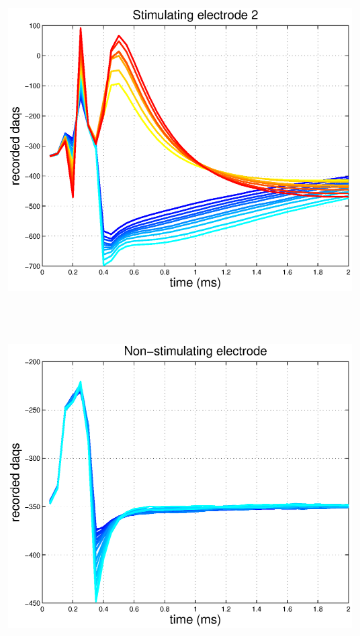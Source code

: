 \documentclass[12pt,letterpaper,fleqn]{article}
\begin{document}
\begin{figure}[ht!]
       ~ \begin{subfigure}[b]{0.32\textwidth}
                \includegraphics[width=\textwidth]{ArtMeanS2.eps}
                \caption{}
        \end{subfigure}
       ~ \begin{subfigure}[b]{0.32\textwidth}
                \includegraphics[width=\textwidth]{ArtMeansNS.eps}
                \caption{}


\end{subfigure}
\end{figure}
\end{document}
